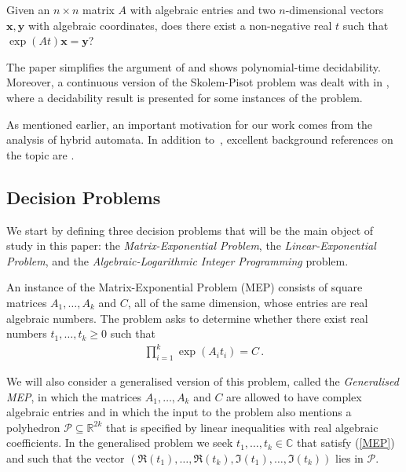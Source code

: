 \begin{definition}
Given an $n \times n$ matrix $A$ with algebraic entries and two
$n$-dimensional vectors $\boldsymbol{x}, \boldsymbol{y}$ with
algebraic coordinates, does there exist a non-negative real $t$ such
that $\exp(At) \boldsymbol{x} = \boldsymbol{y}$?
\end{definition}

The paper \cite{ContinuousOrbitIPL} simplifies the argument of
\cite{Hainry} and shows polynomial-time decidability. Moreover, a
continuous version of the Skolem-Pisot problem was dealt with in
\cite{ContinuousSkolem}, where a decidability result is presented for
some instances of the problem.

As mentioned earlier, an important motivation for our work comes from
the analysis of hybrid automata. In addition to~\cite{Alu15},
excellent background references on the topic are
\cite{HenzingerSTOC,HenzingerLICS}.

\subsection{Decision Problems}

We start by defining three decision problems that will be the main
object of study in this paper: the \emph{Matrix-Exponential Problem},
the \emph{Linear-Exponential Problem}, and the
\emph{Algebraic-Logarithmic Integer Programming} problem.

\begin{definition}
  An instance of the Matrix-Exponential Problem (MEP) consists of
  square matrices $A_{1}, \ldots, A_{k}$ and $C$, all of the same
  dimension, whose entries are real algebraic numbers.  The problem
asks to determine whether there exist real numbers
$t_1,\ldots,t_k \geq 0$ such that
\begin{align}
\label{MEP}
\prod \limits_{i=1}^{k} \exp(A_{i} t_{i}) = C \, .
\end{align}
\label{def:MEP}
\end{definition}

We will also consider a generalised version of this problem, called
the \emph{Generalised MEP}, in which the matrices $A_1,\ldots,A_k$ and
$C$ are allowed to have complex algebraic entries and in which the
input to the problem also mentions a polyhedron
$\mathcal{P}\subseteq\mathbb{R}^{2k}$ that is specified by linear
inequalities with real algebraic coefficients.  In the generalised problem
we seek $t_1,\ldots,t_k \in \mathbb{C}$ that satisfy (\ref{MEP}) and
such that the vector
$(\Re(t_1),\ldots,\Re(t_k),
\Im(t_1),\ldots,\Im(t_k))$ lies in $\mathcal{P}$.

